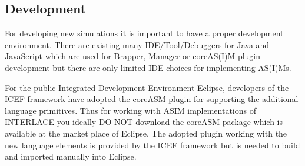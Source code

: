 \subsection{Development}
\label{sec:development}

For developing new simulations it is important to have a proper development environment. There are existing many IDE/Tool/Debuggers for Java and JavaScript which are used for Brapper, Manager or coreAS(I)M plugin development but there are only limited IDE choices for implementing AS(I)Ms.

For the public Integrated Development Environment Eclipse, developers of the ICEF framework have adopted the coreASM plugin for supporting the additional language primitives. Thus for working with ASIM implementations of INTERLACE you ideally DO NOT download the coreASM package which is available at the market place of Eclipse. The adopted plugin working with the new language elements is provided by the ICEF framework but is needed to build and imported manually into Eclipse.


